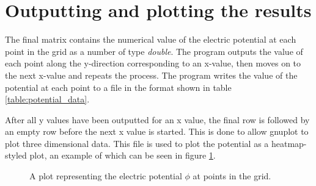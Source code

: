 
\section{Outputting and plotting the results} %
The final matrix contains the numerical value of the electric potential at each point in the grid as a number of type \emph{double}. The program outputs the value of each point along the y-direction corresponding to an x-value, then moves on to the next x-value and repeats the process. The program writes the value of the potential at each point to a file in the format shown in table \ref{table:potential_data}.

After all y values have been outputted for an x value, the final row is followed by an empty row before the next x value is started. This is done to allow gnuplot to plot three dimensional data. This file is used to plot the potential as a heatmap-styled plot, an example of which can be seen in figure \ref{fig:potentialplot}.

\begin{figure}[h!]
\centering
\setlength\fboxsep{0pt}
\setlength\fboxrule{0.5pt}
\label{fig:potentialplot}
\caption{A plot representing the electric potential ${\phi}$ at points in the grid.}
\end{figure}


